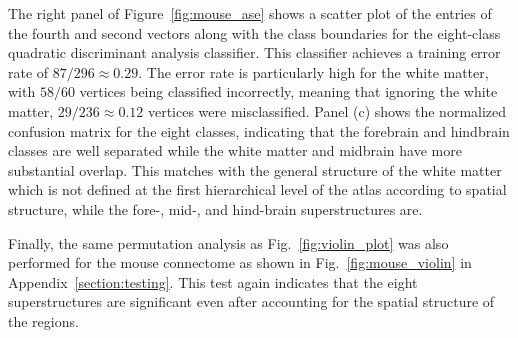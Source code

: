\documentclass[journal,twoside,web]{ieeecolor}
\begin{document}
The right panel of Figure~\ref{fig:mouse_ase} shows a scatter plot of the entries of the fourth and second vectors along with the class boundaries for the eight-class quadratic discriminant analysis classifier. %
This classifier achieves a training error rate of $87/296\approx 0.29$.
The error rate is particularly high for the white matter, with $58/60$ vertices being classified incorrectly, meaning that ignoring the white matter, $29/236 \approx 0.12$ vertices were misclassified. 
Panel (c) shows the normalized confusion matrix for the eight classes, indicating that the forebrain and hindbrain classes are well separated while the white matter and midbrain have more substantial overlap.
This matches with the general structure of the white matter which is not defined at the first hierarchical level of the atlas according to spatial structure, while the fore-, mid-, and hind-brain superstructures are.


Finally, the same permutation analysis as Fig.~\ref{fig:violin_plot} was also performed for the mouse connectome as shown in Fig.~\ref{fig:mouse_violin} in Appendix~\ref{section:testing}.
This test again indicates that the eight superstructures are significant even after accounting for the spatial structure of the regions.
\end{document}

